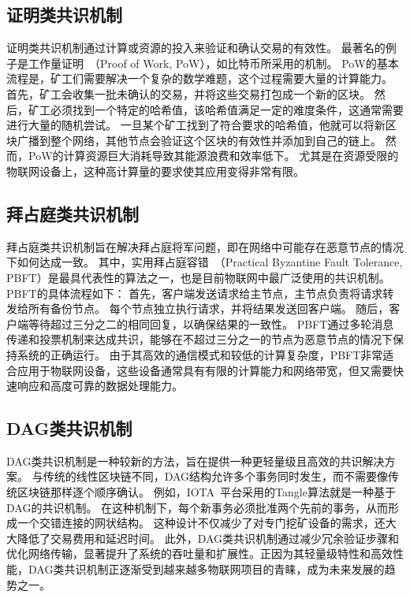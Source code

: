 \subsection{证明类共识机制}
证明类共识机制通过计算或资源的投入来验证和确认交易的有效性。
最著名的例子是工作量证明~\cite{bohme2015bitcoin}（Proof of Work, PoW），如比特币所采用的机制。
PoW的基本流程是，矿工们需要解决一个复杂的数学难题，这个过程需要大量的计算能力。
首先，矿工会收集一批未确认的交易，并将这些交易打包成一个新的区块。
然后，矿工必须找到一个特定的哈希值，该哈希值满足一定的难度条件，这通常需要进行大量的随机尝试。
一旦某个矿工找到了符合要求的哈希值，他就可以将新区块广播到整个网络，其他节点会验证这个区块的有效性并添加到自己的链上。
然而，PoW的计算资源巨大消耗导致其能源浪费和效率低下。
尤其是在资源受限的物联网设备上，这种高计算量的要求使其应用变得非常有限。

\subsection{拜占庭类共识机制}
拜占庭类共识机制旨在解决拜占庭将军问题，即在网络中可能存在恶意节点的情况下如何达成一致。
其中，实用拜占庭容错~\cite{li2020scalable}（Practical Byzantine Fault Tolerance, PBFT）是最具代表性的算法之一，也是目前物联网中最广泛使用的共识机制。
PBFT的具体流程如下：
首先，客户端发送请求给主节点，主节点负责将请求转发给所有备份节点。
每个节点独立执行请求，并将结果发送回客户端。
随后，客户端等待超过三分之二的相同回复，以确保结果的一致性。
PBFT通过多轮消息传递和投票机制来达成共识，能够在不超过三分之一的节点为恶意节点的情况下保持系统的正确运行。
由于其高效的通信模式和较低的计算复杂度，PBFT非常适合应用于物联网设备，这些设备通常具有有限的计算能力和网络带宽，但又需要快速响应和高度可靠的数据处理能力。

\subsection{DAG类共识机制}
DAG类共识机制是一种较新的方法，旨在提供一种更轻量级且高效的共识解决方案。
与传统的线性区块链不同，DAG结构允许多个事务同时发生，而不需要像传统区块链那样逐个顺序确认。
例如，IOTA~\cite{iota}平台采用的Tangle算法就是一种基于DAG的共识机制。
在这种机制下，每个新事务必须批准两个先前的事务，从而形成一个交错连接的网状结构。
这种设计不仅减少了对专门挖矿设备的需求，还大大降低了交易费用和延迟时间。
此外，DAG类共识机制通过减少冗余验证步骤和优化网络传输，显著提升了系统的吞吐量和扩展性。正因为其轻量级特性和高效性能，DAG类共识机制正逐渐受到越来越多物联网项目的青睐，成为未来发展的趋势之一。

